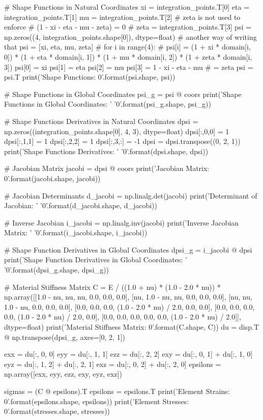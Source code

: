 \documentclass[10pt,b5paper,titlepage]{book}
\begin{document}
\begin{python}
    # Shape Functions in Natural Coordinates
    xi = integration_points.T[0]
    eta = integration_points.T[1]
    mu = integration_points.T[2]
    # zeta is not used to enforce
    # (1 - xi - eta - mu - zeta) = 0
    # zeta = integration_points.T[3]
    psi = np.zeros((4, integration_points.shape[0]), dtype=float)
    # another way of writing that psi = [xi, eta, mu, zeta]
    # for i in range(4):
    #     psi[i] = (1 + xi * domain[i, 0]) * (1 + eta * domain[i, 1]) * (1 + mu * domain[i, 2]) * (1 + zeta * domain[i, 3])
    psi[0] = xi
    psi[1] = eta
    psi[2] = mu
    psi[3] = 1 - xi - eta - mu  # = zeta
    psi = psi.T
    print('Shape Functions: {0}'.format(psi.shape, psi))

    # Shape Functions in Global Coordinates
    psi_g = psi @ coors
    print('Shape Functions in Global Coordinates: '
          '{0}'.format(psi_g.shape, psi_g))

    # Shape Functions Derivatives in Natural Coordinates
    dpsi = np.zeros((integration_points.shape[0], 4, 3), dtype=float)
    dpsi[:,0,0] = 1
    dpsi[:,1,1] = 1
    dpsi[:,2,2] = 1
    dpsi[:,3,:] = -1
    dpsi = dpsi.transpose((0, 2, 1))
    print('Shape Functions Derivatives: '
          '{0}'.format(dpsi.shape, dpsi))

    # Jacobian Matrix
    jacobi = dpsi @ coors
    print('Jacobian Matrix: {0}'.format(jacobi.shape, jacobi))

    # Jacobian Determinants
    d_jacobi = np.linalg.det(jacobi)
    print('Determinant of Jacobian: '
          '{0}'.format(d_jacobi.shape, d_jacobi))

    # Inverse Jacobian
    i_jacobi = np.linalg.inv(jacobi)
    print('Inverse Jacobian Matrix: '
          '{0}'.format(i_jacobi.shape, i_jacobi))

    # Shape Function Derivatives in Global Coordinates
    dpsi_g = i_jacobi @ dpsi
    print('Shape Function Derivatives in Global Coordinates: '
          '{0}'.format(dpsi_g.shape, dpsi_g))

    # Material Stiffness Matrix
    C = E / ((1.0 + nu) * (1.0 - 2.0 * nu)) *
        np.array([[1.0 - nu, nu, nu, 0.0, 0.0, 0.0],
                  [nu, 1.0 - nu, nu, 0.0, 0.0, 0.0],
                  [nu, nu, 1.0 - nu, 0.0, 0.0, 0.0],
                  [0.0, 0.0, 0.0, (1.0 - 2.0 * nu) / 2.0, 0.0, 0.0],
                  [0.0, 0.0, 0.0, 0.0, (1.0 - 2.0 * nu) / 2.0, 0.0],
                  [0.0, 0.0, 0.0, 0.0, 0.0, (1.0 - 2.0 * nu) / 2.0]],
                  dtype=float)
    print('Material Stiffness Matrix: {0}'.format(C.shape, C))
    du = disp.T @ np.transpose(dpsi_g, axes=[0, 2, 1])

    exx = du[:, 0, 0]
    eyy = du[:, 1, 1]
    ezz = du[:, 2, 2]
    exy = du[:, 0, 1] + du[:, 1, 0]
    eyz = du[:, 1, 2] + du[:, 2, 1]
    exz = du[:, 0, 2] + du[:, 2, 0]
    epsilons = np.array([exx, eyy, ezz, exy, eyz, exz])

    sigmas = (C @ epsilons).T
    epsilons = epsilons.T
    print('Element Strains: {0}'.format(epsilons.shape, epsilons))
    print('Element Stresses: {0}'.format(stresses.shape, stresses))
\end{python}
\end{document}
